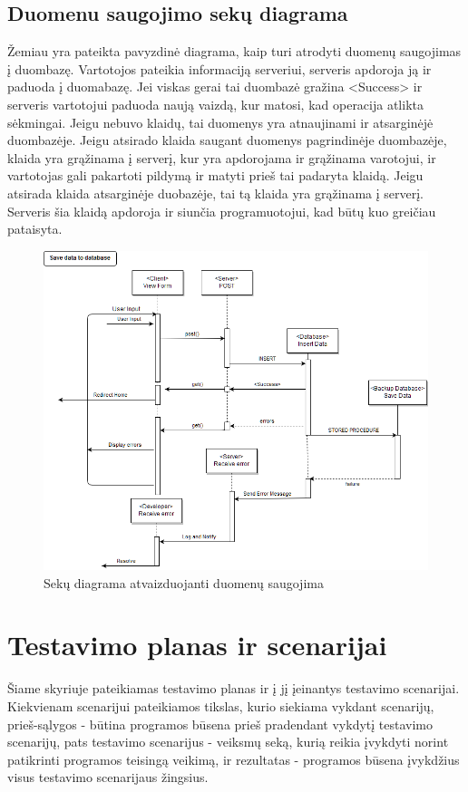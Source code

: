 \documentclass{VUMIFPSkursinis}
\begin{document}
		\subsection{Duomenu saugojimo sekų diagrama} 
		Žemiau yra pateikta pavyzdinė diagrama, kaip turi atrodyti duomenų saugojimas į duombazę. Vartotojos pateikia informaciją serveriui, serveris apdoroja ją ir paduoda į duomabazę. Jei viskas gerai tai duombazė gražina <Success> ir serveris vartotojui paduoda naują vaizdą, kur matosi, kad operacija atlikta sėkmingai. Jeigu nebuvo klaidų, tai duomenys yra atnaujinami ir atsarginėjė duombazėje. Jeigu atsirado klaida saugant duomenys pagrindinėje duombazėje, klaida yra grąžinama į serverį, kur yra apdorojama ir grąžinama varotojui, ir vartotojas gali pakartoti pildymą ir matyti prieš tai padaryta klaidą. Jeigu atsirada klaida atsarginėje duobazėje, tai tą klaida yra grąžinama į serverį. Serveris šia klaidą apdoroja ir siunčia programuotojui, kad būtų kuo greičiau pataisyta. 
		\begin{figure}[H]
			\centering
			\includegraphics[width=\textwidth]{img/PSI5/SavingSequence.png}
			\caption{Sekų diagrama atvaizduojanti duomenų saugojima}
			\label{fig:saugojimo}
		\end{figure}
		
	\section{Testavimo planas ir scenarijai}
		Šiame skyriuje pateikiamas testavimo planas ir į jį įeinantys testavimo scenarijai. Kiekvienam scenarijui pateikiamos tikslas, kurio siekiama vykdant scenarijų, prieš-sąlygos - būtina programos būsena prieš pradendant vykdytį testavimo scenarijų, pats testavimo scenarijus - veiksmų seką, kurią reikia įvykdyti norint patikrinti programos teisingą veikimą, ir rezultatas - programos būsena įvykdžius visus testavimo scenarijaus žingsius.  
		
\end{document}
